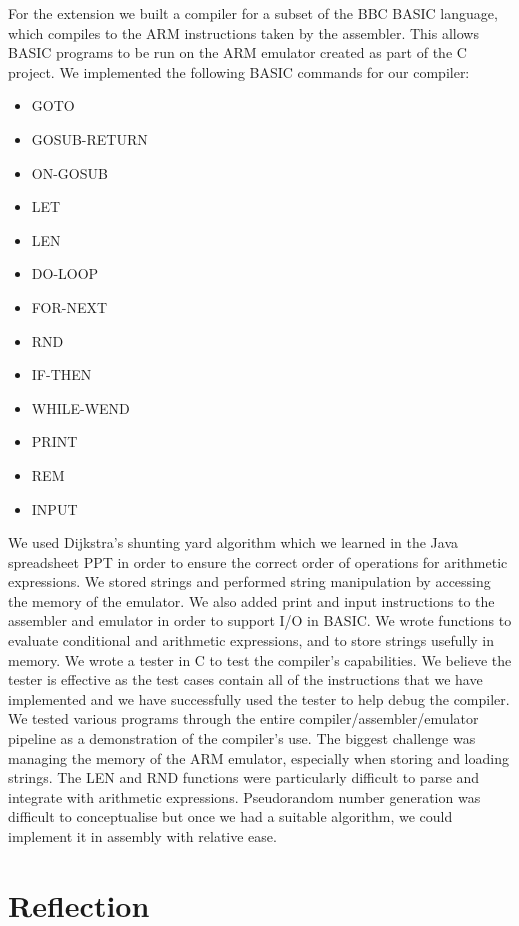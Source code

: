 \documentclass[11pt, letterpaper]{article}
\begin{document}
For the extension we built a compiler for a subset of the BBC BASIC language, which compiles to the ARM instructions taken by the assembler. This allows BASIC programs to be run on the ARM emulator created as part of the C project. We implemented the following BASIC commands for our compiler:
\begin{itemize}
\item GOTO
\item GOSUB-RETURN
\item ON-GOSUB
\item LET
\item LEN
\item DO-LOOP
\item FOR-NEXT
\item RND
\item IF-THEN
\item WHILE-WEND
\item PRINT 
\item REM
\item INPUT 
\end{itemize}

We used Dijkstra's shunting yard algorithm which we learned in the Java spreadsheet PPT in order to ensure the correct order of operations for arithmetic expressions. We stored strings and performed string manipulation by accessing the memory of the emulator. We also added print and input instructions to the assembler and emulator in order to support I/O in BASIC.
We wrote functions to evaluate conditional and arithmetic expressions, and to store strings usefully in memory. We wrote a tester in C to test the compiler's capabilities. We believe the tester is effective as the test cases contain all of the instructions that we have implemented and we have successfully used the tester to help debug the compiler. We tested various programs through the entire compiler/assembler/emulator pipeline as a demonstration of the compiler's use.
The biggest challenge was managing the memory of the ARM emulator, especially when storing and loading strings. The LEN and RND functions were particularly difficult to parse and integrate with arithmetic expressions. Pseudorandom number generation was difficult to conceptualise but once we had a suitable algorithm, we could implement it in assembly with relative ease.

\section{Reflection}
\end{document}
